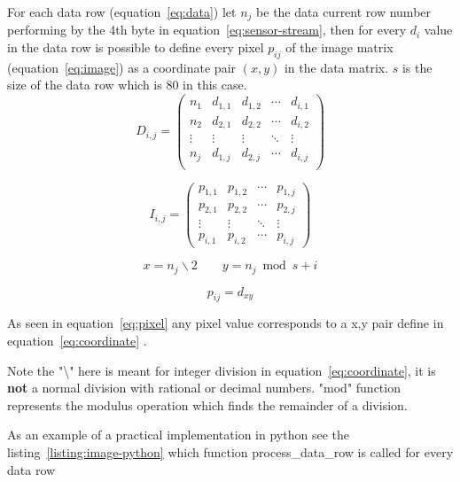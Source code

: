 \documentclass[hidelinks,11pt,a4paper,oneside,article]{memoir}
\begin{document}
For each data row (equation~\ref{eq:data}) let $n_j$ be the data current row number performing by the 4th byte in equation~\ref{eq:sensor-stream}, then for every $d_i$ value in the data row is possible to define every pixel $p_{ij}$ of the image matrix (equation~\ref{eq:image}) as a coordinate pair $(x,y)$ in the data matrix. $s$ is the size of the data row which is 80 in this case.
\begin{equation}
\label{eq:data}
D_{i,j} = 
\begin{pmatrix}
    n_1 & d_{1,1} & d_{1,2} & \cdots & d_{i,1}\\
    n_2 & d_{2,1} & d_{2,2} & \cdots & d_{i,2}\\
 \vdots & \vdots  & \vdots  & \ddots & \vdots  \\
    n_j & d_{1,j} & d_{2,j} & \cdots & d_{i,j}\\
\end{pmatrix}
\end{equation}

\begin{equation}
\label{eq:image}
I_{i,j} = 
\begin{pmatrix}
    p_{1,1} & p_{1,2} & \cdots & p_{1,j} \\
    p_{2,1} & p_{2,2} & \cdots & p_{2,j} \\
    \vdots  & \vdots  & \ddots & \vdots  \\
    p_{i,1} & p_{i,2} & \cdots & p_{i,j} 
\end{pmatrix}
\end{equation}

\begin{equation}
\label{eq:coordinate}
x = n_j \backslash 2  \qquad y = n_j \bmod s + i
\end{equation}

\begin{equation}
\label{eq:pixel}
p_{ij} = d_{xy}
\end{equation}

As seen in equation~\ref{eq:pixel} any pixel value corresponds to a x,y pair define in equation~\ref{eq:coordinate} .

Note the "\textbackslash" here is meant for integer division in equation~\ref{eq:coordinate}, it is \textbf{not} a normal division with rational or decimal numbers. "mod" function represents the modulus operation which finds the remainder of a division.

As an example of a practical implementation in \gls{python} see the listing~\ref{listing:image-python} which function process{\_}data{\_}row is called for every data row
\end{document}
